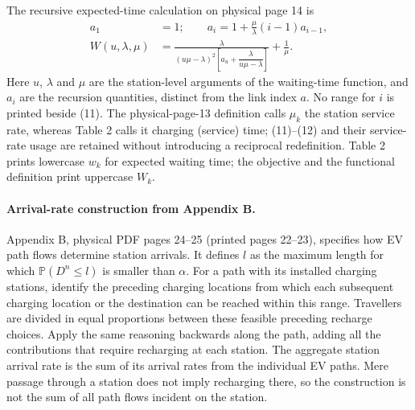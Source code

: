 \documentclass{article}
\begin{document}
The recursive expected-time calculation on physical page 14 is
\begin{align}
a_1&=1;\qquad a_i=1+\frac{\mu}{\lambda}(i-1)a_{i-1},\tag{11}\\
W(u,\lambda,\mu)&=
\frac{\lambda}{(u\mu-\lambda)^2
\left[a_u+\dfrac{\lambda}{u\mu-\lambda}\right]}+\frac{1}{\mu}.\tag{12}
\end{align}
Here $u$, $\lambda$ and $\mu$ are the station-level arguments of the waiting-time function, and $a_i$ are the recursion quantities, distinct from the link index $a$. No range for $i$ is printed beside (11). The physical-page-13 definition calls $\mu_k$ the station service rate, whereas Table 2 calls it charging (service) time; (11)--(12) and their service-rate usage are retained without introducing a reciprocal redefinition. Table 2 prints lowercase $w_k$ for expected waiting time; the objective and the functional definition print uppercase $W_k$.

\paragraph{Arrival-rate construction from Appendix B.}
Appendix B, physical PDF pages 24--25 (printed pages 22--23), specifies how EV path flows determine station arrivals. It defines $l$ as the maximum length for which $\mathbb P(D^n\leq l)$ is smaller than $\alpha$. For a path with its installed charging stations, identify the preceding charging locations from which each subsequent charging location or the destination can be reached within this range. Travellers are divided in equal proportions between these feasible preceding recharge choices. Apply the same reasoning backwards along the path, adding all the contributions that require recharging at each station. The aggregate station arrival rate is the sum of its arrival rates from the individual EV paths. Mere passage through a station does not imply recharging there, so the construction is not the sum of all path flows incident on the station.
\end{document}
